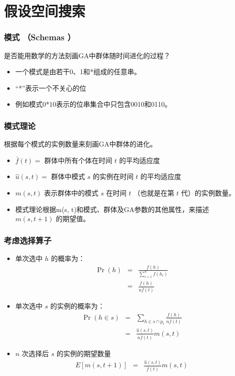 \documentclass{beamer}
\begin{document}
\section{假设空间搜索}
\label{sec-5}
\begin{frame}
\frametitle{模式 （Schemas ）}
\label{sec-5-1}


是否能用数学的方法刻画GA中群体随时间进化的过程？

\begin{itemize}
\item 一个模式是由若干0、1和*组成的任意串。
\item “*”表示一个不关心的位
\item 例如模式0*10表示的位串集合中只包含0010和0110。
\end{itemize}
\end{frame}
\begin{frame}
\frametitle{模式理论}
\label{sec-5-2}


根据每个模式的实例数量来刻画GA中群体的进化。
\begin{itemize}
\item $\bar{f}(t) =$  群体中所有个体在时间 $t$ 的平均适应度
\item $\hat{u}(s,t) =$  群体中模式 $s$ 的实例在时间 $t$ 的平均适应度
\item $m(s, t)$ 表示群体中的模式 $s$ 在时间 $t$ （也就是在第 $t$ 代）的实例数量。
\item 模式理论根据m(s, t)和模式、群体及GA参数的其他属性，来描述 $m(s, t+1)$ 的期望值。
\end{itemize}
\end{frame}
\begin{frame}
\frametitle{考虑选择算子}
\label{sec-5-3}

\begin{itemize}
\item 单次选中 $h$ 的概率为：
       \begin{eqnarray}
       \Pr(h) & = & \frac{f(h)}{\sum_{i=1}^{n} f(h_i)} \nonumber \\
       & = & \frac{f(h)}{n \bar{f}(t)} \nonumber
       \end{eqnarray}
\item 单次选中 $s$ 的实例的概率为：
       \begin{eqnarray}
       \Pr(h \in s) & = & \sum_{h\in s \cap p_{t}} \frac{f(h)}{n \bar{f}(t)} \nonumber \\
        & = & \frac{\hat{u}(s,t)}{n \bar{f}(t)}m(s,t)  \nonumber
       \end{eqnarray}
\item $n$ 次选择后 $s$ 的实例的期望数量
       \begin{eqnarray}
       E[m(s,t+1)] & = & \frac{\hat{u}(s,t)}{\bar{f}(t)}m(s,t)  \nonumber
       \end{eqnarray}
\end{itemize}
\end{frame}
\end{document}
